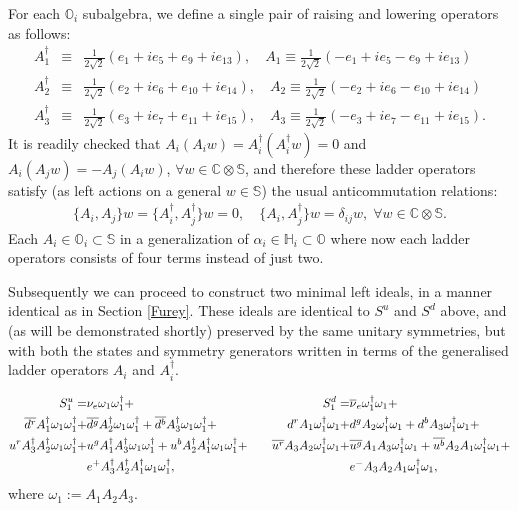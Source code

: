 \documentclass{article}
\newcommand{\bb}[1]{\mathbb{#1}}
\begin{document}
For each $\bb{O}_i$ subalgebra, we define a single pair of raising and lowering operators as follows:
\begin{eqnarray}
\label{newladder1} A_1^{\dagger}&\equiv&\frac{1}{2\sqrt{2}}(e_1+ie_5+e_9+ie_{13}),\quad A_1\equiv \frac{1}{2\sqrt{2}}(-e_1+ie_5-e_9+ie_{13})\\
\label{newladder2} A_2^{\dagger}&\equiv& \frac{1}{2\sqrt{2}}(e_2+ie_6+e_{10}+ie_{14}),\quad A_2\equiv \frac{1}{2\sqrt{2}}(-e_2+ie_6-e_{10}+ie_{14})\\
\label{newladder3} A_3^{\dagger}&\equiv&\frac{1}{2\sqrt{2}}(e_3+ie_7+e_{11}+ie_{15}),\quad A_3\equiv \frac{1}{2\sqrt{2}}(-e_3+ie_7-e_{11}+ie_{15}).
\end{eqnarray}
It is readily checked that $A_i(A_iw)=A_i^{\dagger}(A_i^{\dagger}w)=0$ and $A_i(A_jw)=-A_j(A_iw)$, $\forall w\in \bb{C}\otimes\bb{S}$, and therefore these ladder operators satisfy (as left actions on a general $w\in\bb{S}$) the usual anticommutation relations:
\begin{eqnarray}
    \{A_i,A_j\}w=\{A_i^{\dagger},A_j^{\dagger}\}w=0,\quad \{A_i,A_j^{\dagger}\}w=\delta_{ij}w,\; \forall w\in \bb{C}\otimes\bb{S}.
\end{eqnarray}
Each $A_i\in \bb{O}_i\subset \bb{S}$ in a generalization of $\alpha_i\in\bb{H}_i\subset \bb{O}$ where now each ladder operators consists of four terms instead of just two.

Subsequently we can proceed to construct two minimal left ideals, in a manner identical as in Section \ref{Furey}. These ideals are identical to $S^u$ and $S^d$ above, and (as will be demonstrated shortly) preserved by the same unitary symmetries, but with both the states and symmetry generators written in terms of the generalised ladder operators $A_i$ and $A_i^{\dagger}$. 

\begin{equation} \notag
 \begin{split}
     S_1^u=&{\nu_{e}}\omega_1\omega_1^\dagger + \\  \overline{d^r}{A_1^\dagger}\omega_1\omega_1^\dagger + &\overline{d^g}{A_2^\dagger}\omega_1\omega_1^\dagger + \overline{d^b}{A_3^\dagger}\omega_1\omega_1^\dagger + \\ u^r{A_3^\dagger}{A_2^\dagger}\omega_1\omega_1^\dagger + &u^g{A_1^\dagger}{A_3^\dagger}\omega_1\omega_1^\dagger + u^b{A_2^\dagger}{A_1^\dagger}\omega_1\omega_1^\dagger + \\ &e^+{A_3^\dagger}{A_2^\dagger}{A_1^\dagger}\omega_1\omega_1^\dagger,
\end{split}
\qquad 
\begin{split}
     S_1^d=&{\overline{\nu}_{e}}\omega_1^\dagger\omega_1 + \\ {d}^r{A_1}\omega_1^\dagger\omega_1 + &{d}^g{A_2}\omega_1^\dagger\omega_1 +  {d}^b{A_3}\omega_1^\dagger\omega_1 + \\ \overline{u^r}{A_3}{A_2}\omega_1^\dagger\omega_1 + &\overline{u^g}{A_1}{A_3}\omega_1^\dagger\omega_1 + \overline{u^b}{A_2}{A_1}\omega_1^\dagger\omega_1 + \\ &e^-{A_3}{A_2}{A_1}\omega_1^\dagger\omega_1,
\end{split}
\end{equation}
where $\omega_1:=A_1A_2A_3$.
\end{document}
